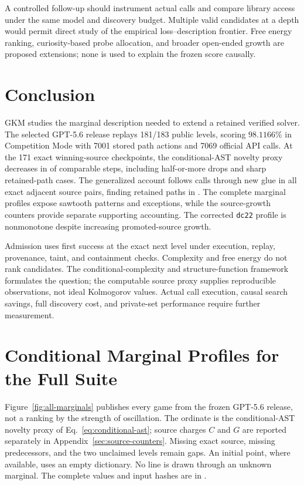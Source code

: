 \documentclass[11pt]{article}
\theoremstyle{definition}
\theoremstyle{remark}
\begin{document}
A controlled follow-up should instrument actual calls and compare library access
under the same model and discovery budget. Multiple valid candidates at a depth
would permit direct study of the empirical loss--description frontier. Free energy
ranking, curiosity-based probe allocation, and broader open-ended growth are proposed
extensions; none is used to explain the frozen score causally.

\section{Conclusion}
GKM studies the marginal description needed to extend a retained verified solver.
The selected GPT-5.6 release replays 181/183 public levels, scoring $98.1166\%$ in
Competition Mode with 7001 stored path actions and 7069 official API calls. At the
171 exact winning-source checkpoints, the conditional-AST novelty proxy decreases
in \GKMDecreases{} of \GKMComparable{} comparable steps, including \GKMSharpDrops{}
half-or-more drops and \GKMGeneralSharpPaths{} sharp retained-path cases. The generalized
account follows calls through new glue in all \GKMGeneralPairs{} exact adjacent
source pairs, finding retained paths in \GKMGeneralPaths{}. The
complete marginal profiles expose sawtooth patterns and exceptions, while the
source-growth counters provide separate supporting accounting. The corrected
\texttt{dc22} profile is nonmonotone despite increasing promoted-source growth.

Admission uses first success at the exact next level under execution, replay,
provenance, taint, and containment checks. Complexity and free energy do not rank
candidates. The conditional-complexity and structure-function framework formulates
the question; the computable source proxy supplies reproducible observations,
not ideal Kolmogorov values. Actual call execution, causal search savings, full
discovery cost, and private-set performance require further measurement.

\appendix
\section{Conditional Marginal Profiles for the Full Suite}
\label{sec:all-marginals}
Figure~\ref{fig:all-marginals} publishes every game from the frozen GPT-5.6 release,
not a ranking by the strength of oscillation. The ordinate is the conditional-AST
novelty proxy of Eq.~\eqref{eq:conditional-ast}; source charges $C$ and $G$ are
reported separately in Appendix~\ref{sec:source-counters}. Missing exact source,
missing predecessors, and the two unclaimed levels remain gaps. An initial point,
where available, uses an empty dictionary. No line is drawn through an unknown
marginal. The complete values and input hashes are in
.
\end{document}
